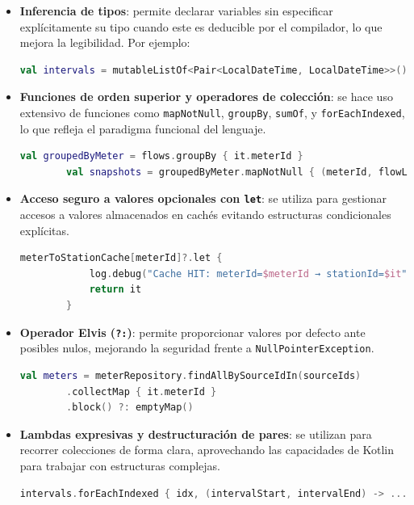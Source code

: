 \begin{itemize}
	\item \textbf{Inferencia de tipos}: permite declarar variables sin especificar explícitamente su tipo cuando este es deducible por el compilador, lo que mejora la legibilidad. Por ejemplo:
	\begin{lstlisting}[language=Kotlin]
		val intervals = mutableListOf<Pair<LocalDateTime, LocalDateTime>>()
	\end{lstlisting}
	
	\item \textbf{Funciones de orden superior y operadores de colección}: se hace uso extensivo de funciones como \texttt{mapNotNull}, \texttt{groupBy}, \texttt{sumOf}, y \texttt{forEachIndexed}, lo que refleja el paradigma funcional del lenguaje.
	\begin{lstlisting}[language=Kotlin]
		val groupedByMeter = flows.groupBy { it.meterId }
		val snapshots = groupedByMeter.mapNotNull { (meterId, flowList) -> ... }
	\end{lstlisting}
	
	\item \textbf{Acceso seguro a valores opcionales con \texttt{let}}: se utiliza para gestionar accesos a valores almacenados en cachés evitando estructuras condicionales explícitas.
	\begin{lstlisting}[language=Kotlin]
		meterToStationCache[meterId]?.let {
			log.debug("Cache HIT: meterId=$meterId → stationId=$it")
			return it
		}
	\end{lstlisting}
	
	\item \textbf{Operador Elvis (\texttt{?:})}: permite proporcionar valores por defecto ante posibles nulos, mejorando la seguridad frente a \texttt{NullPointerException}.
	\begin{lstlisting}[language=Kotlin]
		val meters = meterRepository.findAllBySourceIdIn(sourceIds)
		.collectMap { it.meterId }
		.block() ?: emptyMap()
	\end{lstlisting}
	
	\item \textbf{Lambdas expresivas y destructuración de pares}: se utilizan para recorrer colecciones de forma clara, aprovechando las capacidades de Kotlin para trabajar con estructuras complejas.
	\begin{lstlisting}[language=Kotlin]
		intervals.forEachIndexed { idx, (intervalStart, intervalEnd) -> ... }
	\end{lstlisting}
	

\end{itemize}
